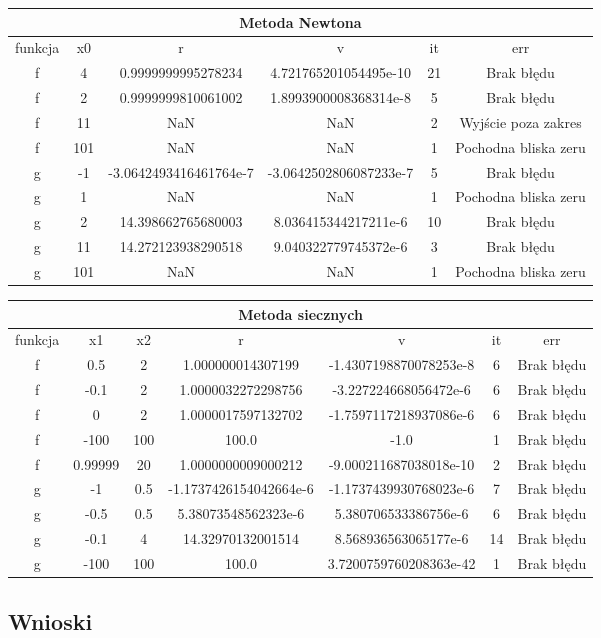 \documentclass[11pt, a4paper]{article}
\begin{document}
    \begin{center}
        \begin{tabular}{|c|c|c|c|c|c|}
            \hline
            \multicolumn{6}{|c|}{Metoda Newtona}\\
            \hline
            funkcja & x0 & r & v & it & err\\
            \hline
            f & 4 & 0.9999999995278234 & 4.721765201054495e-10 & 21 & Brak błędu\\
            f & 2 & 0.9999999810061002 & 1.8993900008368314e-8 & 5 & Brak błędu\\
            f & 11 & NaN & NaN & 2 & Wyjście poza zakres\\
            f & 101 & NaN & NaN & 1 & Pochodna bliska zeru\\
            \hline
            g & -1 & -3.0642493416461764e-7 & -3.0642502806087233e-7 & 5 & Brak błędu\\
            g & 1 & NaN & NaN & 1 & Pochodna bliska zeru\\
            g & 2 & 14.398662765680003 & 8.036415344217211e-6 & 10 & Brak błędu\\
            g & 11 & 14.272123938290518 & 9.040322779745372e-6 & 3 & Brak błędu\\
            g & 101 & NaN & NaN & 1 & Pochodna bliska zeru\\
            \hline
        \end{tabular}
    \end{center}

    \begin{center}
        \begin{tabular}{|c|c|c|c|c|c|c|}
            \hline
            \multicolumn{7}{|c|}{Metoda siecznych}\\
            \hline
            funkcja & x1 & x2 & r & v & it & err\\
            \hline
            f & 0.5 & 2 & 1.000000014307199 & -1.4307198870078253e-8 & 6 & Brak błędu\\
            f & -0.1 & 2 & 1.0000032272298756 & -3.227224668056472e-6 & 6 & Brak błędu\\
            f & 0 & 2 & 1.0000017597132702 & -1.7597117218937086e-6 & 6 & Brak błędu\\
            f & -100 & 100 & 100.0 & -1.0 & 1 & Brak błędu\\
            f & 0.99999 & 20 & 1.0000000009000212 & -9.000211687038018e-10 & 2 & Brak błędu\\
            \hline
            g & -1 & 0.5 & -1.1737426154042664e-6 & -1.1737439930768023e-6 & 7 & Brak błędu\\
            g & -0.5 & 0.5 & 5.38073548562323e-6 & 5.380706533386756e-6 & 6 & Brak błędu\\
            g & -0.1 & 4 & 14.32970132001514 & 8.568936563065177e-6 & 14 & Brak błędu\\
            g & -100 & 100 & 100.0 & 3.7200759760208363e-42 & 1 & Brak błędu\\
            \hline
        \end{tabular}
    \end{center}
    \subsection{Wnioski}
\end{document}
